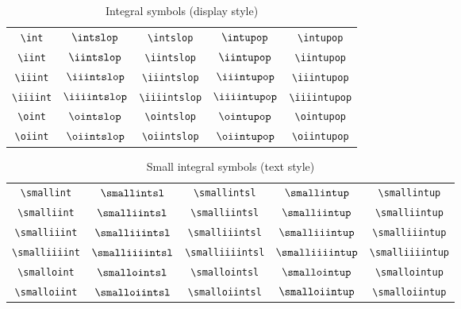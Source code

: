 \documentclass[captions=tableheading]{scrartcl}
\begin{document}
\begin{table}
  \caption{Integral symbols (display style)}
  \label{tab:integrals}
  \centering
  \begin{tabular}[c]{c@{\hskip 2em}cc@{\hskip 3em}cc}
    \toprule
    \verb|\int| &
    $\displaystyle\intslop$ & \verb|\intslop| &
    $\displaystyle\intupop$ & \verb|\intupop| \\
    \addlinespace
    \verb|\iint| &
    $\displaystyle\iintslop$ & \verb|\iintslop| &
    $\displaystyle\iintupop$ & \verb|\iintupop| \\
    \addlinespace
    \verb|\iiint| &
    $\displaystyle\iiintslop$ & \verb|\iiintslop| &
    $\displaystyle\iiintupop$ & \verb|\iiintupop| \\
    \addlinespace
    \verb|\iiiint| &
    $\displaystyle\iiiintslop$ & \verb|\iiiintslop| &
    $\displaystyle\iiiintupop$ & \verb|\iiiintupop| \\
    \addlinespace
    \verb|\oint| &
    $\displaystyle\ointslop$ & \verb|\ointslop| &
    $\displaystyle\ointupop$ & \verb|\ointupop| \\
    \addlinespace
    \verb|\oiint| &
    $\displaystyle\oiintslop$ & \verb|\oiintslop| &
    $\displaystyle\oiintupop$ & \verb|\oiintupop| \\
    \bottomrule
  \end{tabular}
\end{table}

\begin{table}
  \caption{Small integral symbols (text style)}
  \label{tab:small-integrals}
  \centering
  \begin{tabular}[c]{c@{\hskip 2em}cc@{\hskip 3em}cc}
    \toprule
    \verb|\smallint| &
    $\smallintsl$ & \verb|\smallintsl| &
    $\smallintup$ & \verb|\smallintup| \\
    \verb|\smalliint| &
    $\smalliintsl$ & \verb|\smalliintsl| &
    $\smalliintup$ & \verb|\smalliintup| \\
    \verb|\smalliiint| &
    $\smalliiintsl$ & \verb|\smalliiintsl| &
    $\smalliiintup$ & \verb|\smalliiintup| \\
    \verb|\smalliiiint| &
    $\smalliiiintsl$ & \verb|\smalliiiintsl| &
    $\smalliiiintup$ & \verb|\smalliiiintup| \\
    \verb|\smalloint| &
    $\smallointsl$ & \verb|\smallointsl| &
    $\smallointup$ & \verb|\smallointup| \\
    \verb|\smalloiint| &
    $\smalloiintsl$ & \verb|\smalloiintsl| &
    $\smalloiintup$ & \verb|\smalloiintup| \\
    \bottomrule
  \end{tabular}
\end{table}
\end{document}
